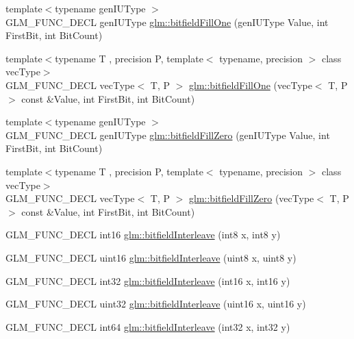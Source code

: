 \begin{DoxyCompactItemize}
\item 
{\footnotesize template$<$typename gen\-I\-U\-Type $>$ }\\G\-L\-M\-\_\-\-F\-U\-N\-C\-\_\-\-D\-E\-C\-L gen\-I\-U\-Type \hyperlink{group__gtc__bitfield_ga46f9295abe3b5c7658f5b13c7f819f0a}{glm\-::bitfield\-Fill\-One} (gen\-I\-U\-Type Value, int First\-Bit, int Bit\-Count)
\item 
{\footnotesize template$<$typename T , precision P, template$<$ typename, precision $>$ class vec\-Type$>$ }\\G\-L\-M\-\_\-\-F\-U\-N\-C\-\_\-\-D\-E\-C\-L vec\-Type$<$ T, P $>$ \hyperlink{group__gtc__bitfield_gad789042e84e8292ae95dc1af856f2ad5}{glm\-::bitfield\-Fill\-One} (vec\-Type$<$ T, P $>$ const \&Value, int First\-Bit, int Bit\-Count)
\item 
{\footnotesize template$<$typename gen\-I\-U\-Type $>$ }\\G\-L\-M\-\_\-\-F\-U\-N\-C\-\_\-\-D\-E\-C\-L gen\-I\-U\-Type \hyperlink{group__gtc__bitfield_ga697b86998b7d74ee0a69d8e9f8819fee}{glm\-::bitfield\-Fill\-Zero} (gen\-I\-U\-Type Value, int First\-Bit, int Bit\-Count)
\item 
{\footnotesize template$<$typename T , precision P, template$<$ typename, precision $>$ class vec\-Type$>$ }\\G\-L\-M\-\_\-\-F\-U\-N\-C\-\_\-\-D\-E\-C\-L vec\-Type$<$ T, P $>$ \hyperlink{group__gtc__bitfield_gaddba3196316b0bd240295b09b43c2958}{glm\-::bitfield\-Fill\-Zero} (vec\-Type$<$ T, P $>$ const \&Value, int First\-Bit, int Bit\-Count)
\item 
G\-L\-M\-\_\-\-F\-U\-N\-C\-\_\-\-D\-E\-C\-L int16 \hyperlink{group__gtc__bitfield_ga24cad0069f9a0450abd80b3e89501adf}{glm\-::bitfield\-Interleave} (int8 x, int8 y)
\item 
G\-L\-M\-\_\-\-F\-U\-N\-C\-\_\-\-D\-E\-C\-L uint16 \hyperlink{group__gtc__bitfield_ga9a4976a529aec2cee56525e1165da484}{glm\-::bitfield\-Interleave} (uint8 x, uint8 y)
\item 
G\-L\-M\-\_\-\-F\-U\-N\-C\-\_\-\-D\-E\-C\-L int32 \hyperlink{group__gtc__bitfield_gac51c33a394593f0631fa3aa5bb778809}{glm\-::bitfield\-Interleave} (int16 x, int16 y)
\item 
G\-L\-M\-\_\-\-F\-U\-N\-C\-\_\-\-D\-E\-C\-L uint32 \hyperlink{group__gtc__bitfield_ga94f3646a5667f4be56f8dcf3310e963f}{glm\-::bitfield\-Interleave} (uint16 x, uint16 y)
\item 
G\-L\-M\-\_\-\-F\-U\-N\-C\-\_\-\-D\-E\-C\-L int64 \hyperlink{group__gtc__bitfield_gaebb756a24a0784e3d6fba8bd011ab77a}{glm\-::bitfield\-Interleave} (int32 x, int32 y)

\end{DoxyCompactItemize}
